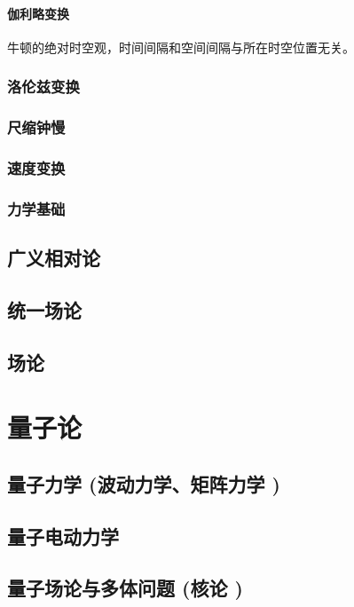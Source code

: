 \documentclass[UTF8]{../06-Physics}
\begin{document}
\subsubsection{伽利略变换}
牛顿的绝对时空观，时间间隔和空间间隔与所在时空位置无关。


\subsection{洛伦兹变换}



\subsection{尺缩钟慢}
\subsection{速度变换}
\subsection{力学基础}



\section{广义相对论}


\section{统一场论}
\section{场论}




\chapter{量子论} %
    \section{量子力学 (波动力学、矩阵力学 )}
    \section{量子电动力学}
    \section{量子场论与多体问题 (核论 )}
\end{document}
